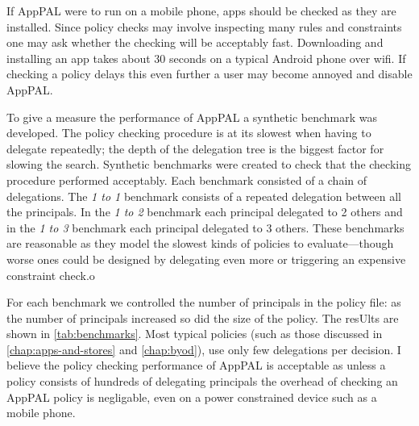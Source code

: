 \documentclass[thesis.tex]{subfiles}
\begin{document}
If AppPAL were to run on a mobile phone, apps should be checked as they are installed.
Since policy checks may involve inspecting many rules and constraints one may ask whether the checking will be acceptably fast.
Downloading and installing an app takes about 30 seconds on a typical Android phone over wifi.
If checking a policy delays this even further a user may become annoyed and disable AppPAL.

To give a measure the performance of AppPAL a synthetic benchmark was developed.
The policy checking procedure is at its slowest when having to delegate repeatedly;
the depth of the delegation tree is the biggest factor for slowing the search.
Synthetic benchmarks were created to check that the checking procedure performed acceptably.
Each benchmark consisted of a chain of delegations.
The \emph{1 to 1} benchmark consists of a repeated delegation between all the principals.
In the \emph{1 to 2} benchmark each principal delegated to 2 others and in the \emph{1 to 3} benchmark each principal delegated to 3 others.
These benchmarks are reasonable as they model the slowest kinds of policies to
evaluate---though worse ones could be designed by delegating even more or triggering an expensive constraint check.o

For each benchmark we controlled the number of principals in the policy file:
as the number of principals increased so did the size of the policy.
The resUlts are shown in \autoref{tab:benchmarks}.
Most typical policies (such as those discussed in \autoref{chap:apps-and-stores} and \autoref{chap:byod}), use only few delegations per decision.
I believe the policy checking performance of AppPAL is acceptable as unless a policy consists of hundreds of delegating principals the overhead of checking an AppPAL policy is negligable, even on a power constrained device such as a mobile phone.
\end{document}
